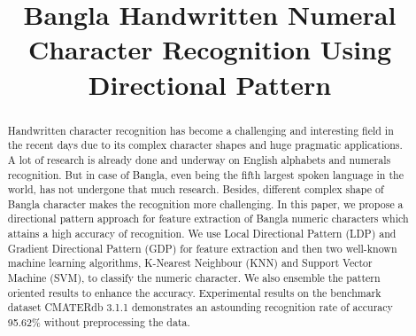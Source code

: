 \documentclass[conference]{IEEEtran}
\begin{document}
\title{Bangla Handwritten Numeral Character Recognition Using Directional Pattern}


\author{
}


\maketitle

\thispagestyle{fancy}
\renewcommand{\headrulewidth}{0pt}



\begin{abstract}
Handwritten character recognition has become a challenging and interesting field in the recent days due to its complex character shapes and huge pragmatic applications. A lot of research is already done and underway on English alphabets and numerals recognition. But in case of Bangla, even being the fifth largest spoken language in the world, has not undergone that much research. Besides, different complex shape of Bangla character makes the recognition more challenging. In this paper, we propose a directional pattern approach for feature extraction of Bangla numeric characters which attains a high accuracy of recognition. We use Local Directional Pattern (LDP) and Gradient Directional Pattern (GDP) for feature extraction and then two well-known machine learning algorithms, K-Nearest Neighbour (KNN) and Support Vector Machine (SVM), to classify the numeric character. We also ensemble the pattern oriented results to enhance the accuracy. Experimental results on the benchmark dataset CMATERdb 3.1.1 demonstrates an astounding recognition rate of accuracy 95.62\% without preprocessing the data.
\end{abstract}
\end{document}
